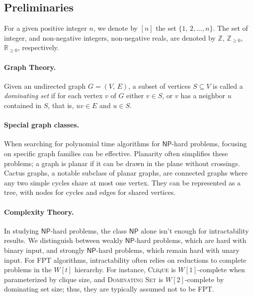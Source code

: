 \documentclass[11pt, twoside]{article}
\numberwithin{equation}{section}
\numberwithin{table}{section}
\numberwithin{figure}{section}
\theoremstyle{definition}
\theoremstyle{definition}
\theoremstyle{definition}
\def\NP{\mathsf{NP}}
\begin{document}
\newpage
\begin{appendices}


\section{Preliminaries}\label{sec:prelim}
For a given positive integer $n$, we denote by $[n]$ the set $\{ 1, \, 2, \dots, n \}$.  The set of integer, and non-negative integers, non-negative reals, are denoted by $\mathbb{Z}$, $\mathbb{Z}_{\geq 0}$, $\mathbb{R}_{\geq 0}$, respectively.
\vspace{-2ex}
\paragraph{Graph Theory.} 
Given an undirected graph  $G= (V, \, E)$, a subset of vertices $S \subseteq V$ is called a \emph{dom\-i\-nat\-ing set} if for each vertex $v$ of $G$ either $v\in S$, or $v$ has a neighbor $u$ contained in $S$, that is, $uv \in E$ and $u \in S$.
\vspace{-2ex}
\paragraph{Special graph classes.}
When searching for polynomial time algorithms for $\NP$-hard problems, focusing on specific graph families can be effective. Planarity often simplifies these problems; a graph is planar if it can be drawn in the plane without crossings. Cactus graphs, a notable subclass of planar graphs, are connected graphs where any two simple cycles share at most one vertex. They can be represented as a tree, with nodes for cycles and edges for shared vertices.
\vspace{-2ex}
\paragraph{Complexity Theory.} In studying $\NP$-hard problems, the class $\NP$ alone isn't enough for intractability results. We distinguish between weakly $\NP$-hard problems, which are hard with binary input, and strongly $\NP$-hard problems, which remain hard with unary input. For FPT algorithms, intractability often relies on reductions to complete problems in the $W[t]$ hierarchy. For instance, \textsc{Clique} is $W[1]$-complete when parameterized by clique size, and \textsc{Dominating Set} is $W[2]$-complete by dominating set size; thus, they are typically assumed not to be FPT.
\vspace{-2ex}

\end{appendices}
\end{document}
